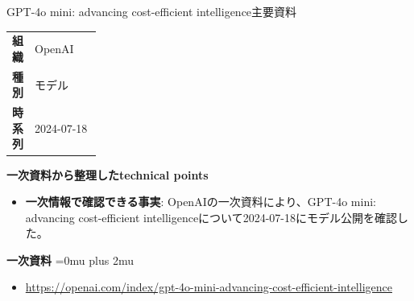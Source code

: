 \begin{technicalnote}{GPT-4o mini: advancing cost-efficient intelligence}{主要資料}
\begingroup
\begin{tabularx}{\linewidth}{@{}>{\bfseries}p{0.22\linewidth}X@{}}
組織 & OpenAI \\
種別 & モデル \\
時系列 & 2024-07-18 \\
\end{tabularx}
\smallskip
{\bfseries 一次資料から整理したtechnical points}
\begin{itemize}[leftmargin=1.5em,itemsep=0.35em]
\item \textbf{一次情報で確認できる事実}: OpenAIの一次資料により、GPT-4o mini: advancing cost-efficient intelligenceについて2024-07-18にモデル公開を確認した。
\end{itemize}
\begin{minipage}{\linewidth}
\begin{samepage}
{\bfseries 一次資料}
\begingroup\sloppy
\Urlmuskip=0mu plus 2mu\relax
\begin{itemize}[leftmargin=1.5em,itemsep=0.25em]
\item {\scriptsize\url{https://openai.com/index/gpt-4o-mini-advancing-cost-efficient-intelligence}}
\end{itemize}
\endgroup
\end{samepage}
\end{minipage}
\endgroup
\end{technicalnote}
\medskip

